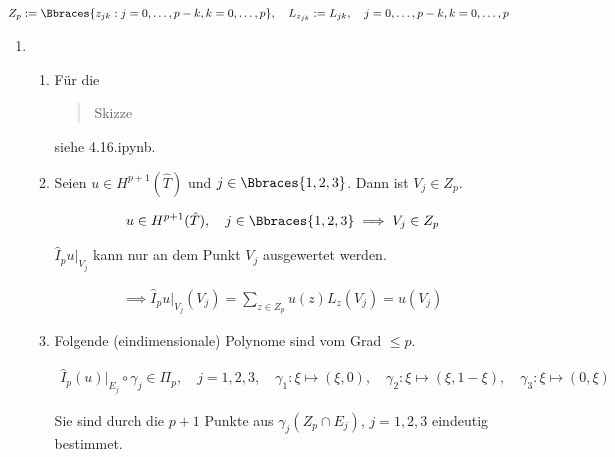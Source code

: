 
  \begin{solution}

  \begin{align*}
    Z_p
    :=
    \Bbraces{z_{jk}: j = 0, \dots, p - k, k = 0, \dots, p},
    \quad
    L_{z_{jk}}
    :=
    L_{jk},
    \quad
    j = 0, \dots, p - k, k = 0, \dots, p
  \end{align*}

  \begin{enumerate}[label = \textbf{\alph*)}]

    \item

    \begin{enumerate}[label = (\roman*)]

      \item Für die \blockquote{Skizze} siehe 4.16.ipynb.

      \item Seien $u \in H^{p+1}(\hat T)$ und $j \in \Bbraces{1, 2, 3}$.
      Dann ist $V_j \in Z_p$.

      \begin{align*}
        u \in H^{p+1}(\hat T),
        \quad
        j \in \Bbraces{1, 2, 3}
        \implies
        V_j \in Z_p
      \end{align*}

      $\hat I_p u|_{V_j}$ kann nur an dem Punkt $V_j$ ausgewertet werden.

      \begin{align*}
        \implies
        \hat I_p u|_{V_j}(V_j)
        =
        \sum_{z \in Z_p}
        u(z) L_z(V_j)
        =
        u(V_j)
      \end{align*}

      \item Folgende (eindimensionale) Polynome sind vom Grad $\leq p$.

      \begin{align*}
        \hat I_p(u)|_{E_j} \circ \gamma_j \in \Pi_p,
        \quad
        j = 1, 2, 3,
        \quad
        \gamma_1: \xi \mapsto (\xi, 0),
        \quad
        \gamma_2: \xi \mapsto (\xi, 1 - \xi),
        \quad
        \gamma_3: \xi \mapsto (0, \xi)
      \end{align*}

      Sie sind durch die $p + 1$ Punkte aus $\gamma_j(Z_p \cap E_j)$, $j = 1, 2, 3$ eindeutig bestimmet.


\end{enumerate}
\end{enumerate}
\end{solution}
